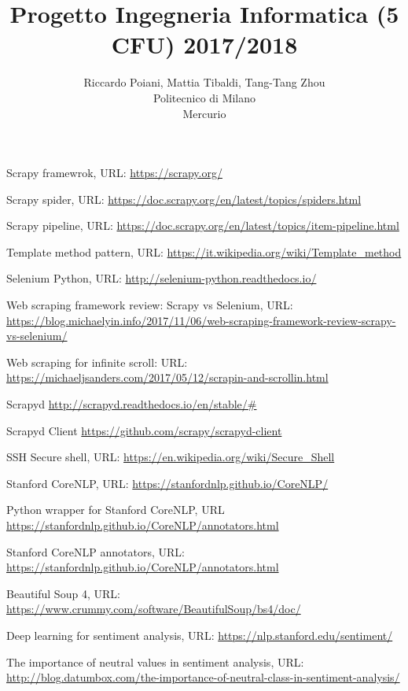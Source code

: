\documentclass[a4paper]{article}
\begin{document}
\title{Progetto Ingegneria Informatica (5 CFU) 2017/2018}
\author{
        Riccardo Poiani, Mattia Tibaldi, Tang-Tang Zhou \\
        Politecnico di Milano\\  
        Mercurio              
}
\maketitle
\newpage
\tableofcontents
{}
\newpage


\newpage

\newpage

\newpage

\clearpage
\begin{thebibliography}{9}
Scrapy framewrok, URL: \url{https://scrapy.org/}

Scrapy spider, URL: \url{https://doc.scrapy.org/en/latest/topics/spiders.html}

Scrapy pipeline, URL: \url{https://doc.scrapy.org/en/latest/topics/item-pipeline.html}

Template method pattern, URL: \url{https://it.wikipedia.org/wiki/Template_method}

Selenium Python, URL: \url{http://selenium-python.readthedocs.io/}

Web scraping framework review: Scrapy vs Selenium, URL: \url{https://blog.michaelyin.info/2017/11/06/web-scraping-framework-review-scrapy-vs-selenium/}

Web scraping for infinite scroll: URL: \url{https://michaeljsanders.com/2017/05/12/scrapin-and-scrollin.html}

Scrapyd \url{http://scrapyd.readthedocs.io/en/stable/#}

Scrapyd Client \url{https://github.com/scrapy/scrapyd-client}

SSH Secure shell, URL: \url{https://en.wikipedia.org/wiki/Secure_Shell}

Stanford CoreNLP, URL: \url{https://stanfordnlp.github.io/CoreNLP/}

Python wrapper for Stanford CoreNLP, URL \url{https://stanfordnlp.github.io/CoreNLP/annotators.html}

Stanford CoreNLP annotators, URL: \url{https://stanfordnlp.github.io/CoreNLP/annotators.html}

Beautiful Soup 4, URL: \url{https://www.crummy.com/software/BeautifulSoup/bs4/doc/}

Deep learning for sentiment analysis, URL: \url{https://nlp.stanford.edu/sentiment/}

The importance of neutral values in sentiment analysis, URL: \url{http://blog.datumbox.com/the-importance-of-neutral-class-in-sentiment-analysis/}

\end{thebibliography}
\end{document}
